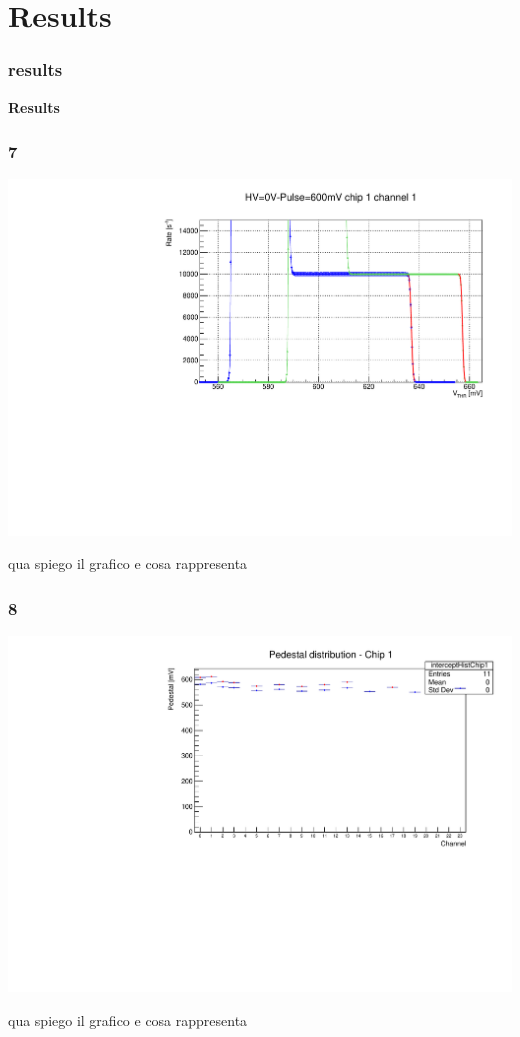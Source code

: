 \documentclass[aspectratio=169]{beamer}
\begin{document}
	\section{Results}
	
	\begin{frame}
	\frametitle{results}
	\begin{center}
		{\Huge {}\selectfont \color{blue} \textbf{Results}}
	\end{center}
	\end{frame}
	
	\begin{frame}
	\frametitle{7 }
	
		\begin{center}
			\includegraphics[width=0.75 \textwidth]{IMG/ThScan_ch0.pdf}
		\end{center}
	
	\color{red}  qua spiego il grafico e cosa rappresenta
	
	\end{frame}

	\begin{frame}
	\frametitle{8 }
	
	\begin{center}
		\includegraphics[width=0.75 \textwidth]{IMG/TB1-DAC0-DAC63.pdf}
	\end{center}
	
	\color{red}  qua spiego il grafico e cosa rappresenta
	
	\end{frame}
\end{document}

